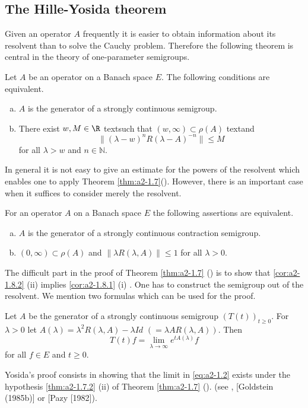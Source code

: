 \subsection{The Hille-Yosida theorem} \label{subsec:a2-1.se3}
Given an operator $A$ frequently it is easier to obtain information about its resolvent than to solve the Cauchy problem.
Therefore the following theorem is central in the theory of one-parameter semigroups.
\begin{theorem}\label{thm:a2-1.7}
Let $A$ be an operator on a Banach space $E$.
The following conditions are equivalent.
\begin{enumerate}[(a)]
\item \label{thm:a2-1.7.1}
$A$ is the generator of a strongly continuous semigroup.
\item \label{thm:a2-1.7.2}
There exist $w, M \in \R$ text{such that} $(w,\infty) \subset \rho(A)$ text{and} 
\[
    \| {(\lambda - w)^{n}} R(\lambda-A)^{-n}\| \leq M 
\]
for all $\lambda > w$ and $n \in \mathbb{N}$.
\end{enumerate}
\end{theorem}
In general it is not easy to give an estimate for the powers of the resolvent which enables one to apply Theorem \ref{thm:a2-1.7}().
However, there is an important case when it suffices to consider merely the resolvent.
\begin{corollary}\label{cor:a2-1.8}
For an operator $A$ on a Banach space $E$ the following assertions are equivalent.
\begin{enumerate}[(a)]
\item \label{cor:a2-1.8.1}
$A$ is the generator of a strongly continuous contraction semigroup.
\item \label{cor:a2-1.8.2}
$(0,\infty) \subset \rho(A)$ and $\|\lambda R(\lambda,A)\| \leq 1$ for all $\lambda > 0$.
\end{enumerate}
\end{corollary}
The difficult part in the proof of Theorem \ref{thm:a2-1.7} () is to show that \ref{cor:a2-1.8.2} (\lnm ii) implies \ref{cor:a2-1.8.1} (\lnm i) .
One has to construct the semigroup out of the resolvent.
We mention two formulas which can be used for the proof.
\begin{proposition}\label{prop:a2-1.9}
Let $A$ be the generator of a strongly continuous semigroup
$(T(t))_{t \geq 0}$.
For $\lambda > 0$ let $A(\lambda) = \lambda^{2}R(\lambda,A)-\lambda Id$ $(=\lambda A R(\lambda,A))$.
Then
\begin{equation}\label{eq:a2-1.2}
    T(t)f = \lim_{\lambda \to \infty} e^{tA(\lambda)}f
\end{equation}
for all $f \in E$ and $t \geq 0$.
\end{proposition}
Yosida's proof consists in showing that the limit in \eqref{eq:a2-1.2} exists under the hypothesis  \ref{thm:a2-1.7.2} 
(\lnm ii) of Theorem  \ref{thm:a2-1.7} (). (see \citet{davies:1980}, [Goldstein (1985b)] or [Pazy [1982]).


